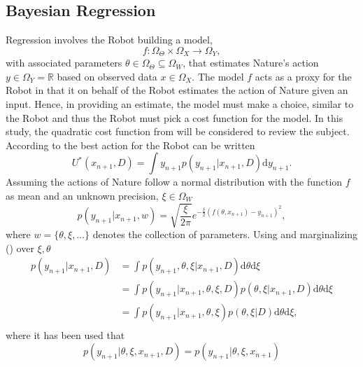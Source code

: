 \subsection{Bayesian Regression}
\label{chp:regression}
Regression involves the Robot building a model,
\begin{equation}
	f: \Omega_\Theta\times \Omega_X\to\Omega_Y,
\end{equation} 
with associated parameters $\theta\in\Omega_\Theta \subseteq\Omega_W$, that estimates Nature's action $y\in \Omega_Y=\mathbb{R}$ based on observed data $x\in \Omega_X$. The model $f$ acts as a proxy for the Robot in that it on behalf of the Robot estimates the action of Nature given an input. Hence, in providing an estimate, the model must make a choice, similar to the Robot and thus the Robot must pick a cost function for the model. In this study, the quadratic cost function from  will be considered to review the subject. According to  the best action for the Robot can be written
\begin{equation}
	U^*(x_{n+1},D) = \int y_{n+1} p(y_{n+1}|x_{n+1},D) \mathrm{d}y_{n+1}.
	\label{eq:q1}
\end{equation}
Assuming the actions of Nature follow a normal distribution with the function $f$ as mean and an unknown precision, $\xi\in \Omega_W$
\begin{equation}
	p(y_{n+1}|x_{n+1},w)=\sqrt{\frac{\xi}{2\pi}} e^{-\frac{\xi}{2}(f(\theta,x_{n+1})-y_{n+1})^2},
	\label{f_dist}
\end{equation}
where $w = \{\theta, \xi,\dots\}$ denotes the collection of parameters. Using  and marginalizing () over $\xi,\theta$
\begin{equation}
	\begin{split}
		p(y_{n+1}|x_{n+1},D) &= \int  p(y_{n+1},\theta,\xi|x_{n+1},D) \mathrm{d}\theta \mathrm{d}\xi\\
		& = \int  p(y_{n+1}|x_{n+1},\theta,\xi,D)  p(\theta,\xi|x_{n+1},D)\mathrm{d}\theta \mathrm{d}\xi\\
		& = \int  p(y_{n+1}|x_{n+1},\theta,\xi)  p(\theta,\xi|D) \mathrm{d}\theta \mathrm{d}\xi,\\
	\end{split}
	\label{eq:q2}
\end{equation}
where it has been used that 
\begin{equation}
	p(y_{n+1}|\theta,\xi,x_{n+1},D) = p(y_{n+1}|\theta,\xi,x_{n+1})
\end{equation}
